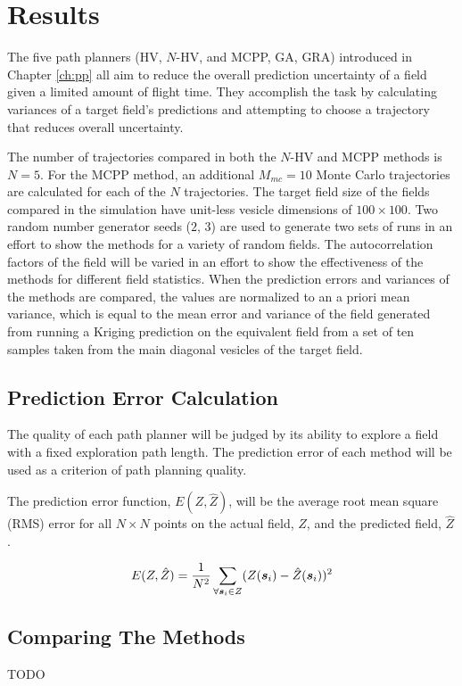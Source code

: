 \chapter{Results}
The five path planners (HV, $N$-HV, and MCPP, GA, GRA) introduced in Chapter \ref{ch:pp} all aim to reduce the overall prediction uncertainty of a field given a limited amount of flight time. They accomplish the task by calculating variances of a target field's predictions and attempting to choose a trajectory that reduces overall uncertainty. 

The number of trajectories compared in both the $N$-HV and MCPP methods is $N=5$. For the MCPP method, an additional $M_{mc}=10$ Monte Carlo trajectories are calculated for each of the $N$ trajectories. The target field size of the fields compared in the simulation have unit-less vesicle dimensions of $100\times 100$. Two random number generator seeds ($2$, $3$) are used to generate two sets of runs in an effort to show the methods for a variety of random fields. The autocorrelation factors of the field will be varied in an effort to show the effectiveness of the methods for different field statistics. When the prediction errors and variances of the methods are compared, the values are normalized to an a priori mean variance, which is equal to the mean error and variance of the field generated from running a Kriging prediction on the equivalent field from a set of ten samples taken from the main diagonal vesicles of the target field.

\section{Prediction Error Calculation}
The quality of each path planner will be judged by its ability to explore a field with a fixed exploration path length. The prediction error of each method will be used as a criterion of path planning quality.

The prediction error function, $E (Z,\hat{Z})$, will be the average root mean square (RMS) error for all $N\times N$ points on the actual field, $Z$, and the predicted field, $\hat{Z}$.

\begin{equation}
E (Z, \hat{Z}) = \frac{1}{N^2}\sum_{\forall {\it{\boldsymbol{s}}}_i \in Z} (Z({\it{\boldsymbol{s}}}_i) - \hat{Z}({\it{\boldsymbol{s}}}_i))^2
\end{equation}

% 

\section{Comparing The Methods}
TODO